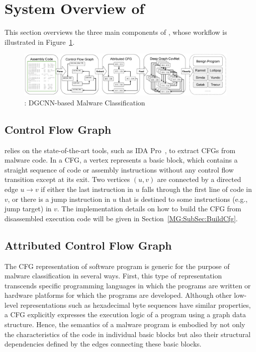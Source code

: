 \section{System Overview of \sysname}
\label{MG:Sec:System}

This section overviews the three main components of \sysname, whose workflow is illustrated in Figure~\ref{MG:Fig:SystemPipeline}.

\begin{figure}[htbp]
    \centerline{\includegraphics[width=0.96\textwidth]{Magic/figures/SystemPipeline.eps}}
    \caption{\sysname: DGCNN-based Malware Classification}
    \label{MG:Fig:SystemPipeline}
\end{figure}

\subsection{Control Flow Graph}
\label{MG:Subsec:ConstructCfg}

\sysname relies on the state-of-the-art tools, such as IDA Pro~\cite{bib:idapro}, to extract CFGs from malware code.
In a CFG, a vertex represents a basic block, which contains a straight sequence of code or assembly instructions without any control flow transition except at its exit.
Two vertices $(u, v)$ are connected by a directed edge $u \rightarrow v$ if either the last instruction in $u$ falls through the first line of code in $v$,
or there is a jump instruction in $u$ that is destined to some instructions (e.g., jump target) in $v$.
The implementation details on how to build the CFG from disassembled execution code will be given in Section~\ref{MG:SubSec:BuildCfg}.

\subsection{Attributed Control Flow Graph}
\label{MG:SubSec:Cfg2Acfg}
The CFG representation of software program is generic for the purpose of malware classification in several ways.
First, this type of representation transcends specific programming languages in which the programs are written or hardware platforms for which the programs are developed.
Although other low-level representations such as hexadecimal byte sequences have similar properties, a CFG explicitly expresses the execution logic of a program using a graph data structure.
Hence, the semantics of a malware program is embodied by not only the characteristics of the code in individual basic blocks but also their structural dependencies defined by the edges connecting these basic blocks. 


